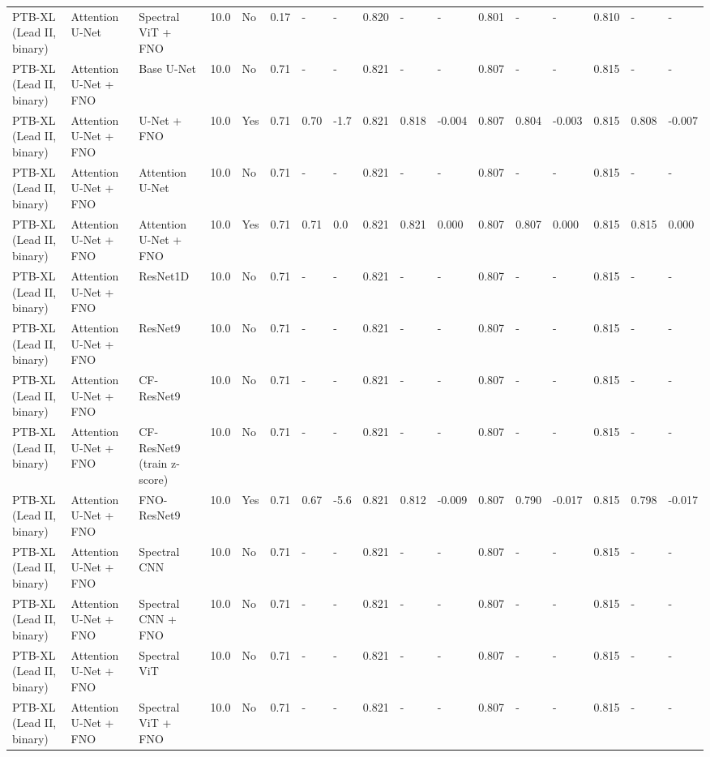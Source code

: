 \begin{longtable}{lllllllllllllllll}
PTB-XL (Lead II, binary) & Attention U-Net & Spectral ViT + FNO & 10.0 & No & 0.17 & - & - & 0.820 & - & - & 0.801 & - & - & 0.810 & - & - \\
PTB-XL (Lead II, binary) & Attention U-Net + FNO & Base U-Net & 10.0 & No & 0.71 & - & - & 0.821 & - & - & 0.807 & - & - & 0.815 & - & - \\
PTB-XL (Lead II, binary) & Attention U-Net + FNO & U-Net + FNO & 10.0 & Yes & 0.71 & 0.70 & -1.7 & 0.821 & 0.818 & -0.004 & 0.807 & 0.804 & -0.003 & 0.815 & 0.808 & -0.007 \\
PTB-XL (Lead II, binary) & Attention U-Net + FNO & Attention U-Net & 10.0 & No & 0.71 & - & - & 0.821 & - & - & 0.807 & - & - & 0.815 & - & - \\
PTB-XL (Lead II, binary) & Attention U-Net + FNO & Attention U-Net + FNO & 10.0 & Yes & 0.71 & 0.71 & 0.0 & 0.821 & 0.821 & 0.000 & 0.807 & 0.807 & 0.000 & 0.815 & 0.815 & 0.000 \\
PTB-XL (Lead II, binary) & Attention U-Net + FNO & ResNet1D & 10.0 & No & 0.71 & - & - & 0.821 & - & - & 0.807 & - & - & 0.815 & - & - \\
PTB-XL (Lead II, binary) & Attention U-Net + FNO & ResNet9 & 10.0 & No & 0.71 & - & - & 0.821 & - & - & 0.807 & - & - & 0.815 & - & - \\
PTB-XL (Lead II, binary) & Attention U-Net + FNO & CF-ResNet9 & 10.0 & No & 0.71 & - & - & 0.821 & - & - & 0.807 & - & - & 0.815 & - & - \\
PTB-XL (Lead II, binary) & Attention U-Net + FNO & CF-ResNet9 (train z-score) & 10.0 & No & 0.71 & - & - & 0.821 & - & - & 0.807 & - & - & 0.815 & - & - \\
PTB-XL (Lead II, binary) & Attention U-Net + FNO & FNO-ResNet9 & 10.0 & Yes & 0.71 & 0.67 & -5.6 & 0.821 & 0.812 & -0.009 & 0.807 & 0.790 & -0.017 & 0.815 & 0.798 & -0.017 \\
PTB-XL (Lead II, binary) & Attention U-Net + FNO & Spectral CNN & 10.0 & No & 0.71 & - & - & 0.821 & - & - & 0.807 & - & - & 0.815 & - & - \\
PTB-XL (Lead II, binary) & Attention U-Net + FNO & Spectral CNN + FNO & 10.0 & No & 0.71 & - & - & 0.821 & - & - & 0.807 & - & - & 0.815 & - & - \\
PTB-XL (Lead II, binary) & Attention U-Net + FNO & Spectral ViT & 10.0 & No & 0.71 & - & - & 0.821 & - & - & 0.807 & - & - & 0.815 & - & - \\
PTB-XL (Lead II, binary) & Attention U-Net + FNO & Spectral ViT + FNO & 10.0 & No & 0.71 & - & - & 0.821 & - & - & 0.807 & - & - & 0.815 & - & - \\

\end{longtable}
